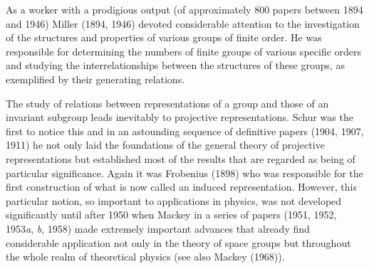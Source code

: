 \documentclass[11pt,a4paper,twoside,openright]{book}
\begin{document}
As a worker with a prodigious output (of approximately 800 papers between 1894 and 1946) Miller (1894, 1946) devoted considerable attention to the investigation of the structures and properties of various groups of finite order. He was responsible for determining the numbers of finite groups of various specific orders and studying the interrelationships between the structures of these groups, as exemplified by their generating relations.

The study of relations between representations of a group and those of an invariant subgroup leads inevitably to projective representations. Schur was the first to notice this and in an astounding sequence of definitive papers (1904, 1907, 1911) he not only laid the foundations of the general theory of projective representations but established most of the results that are regarded as being of particular significance. Again it was Frobenius (1898) who was responsible for the first construction of what is now called an induced representation. However, this particular notion, so important to applications in physics, was not developed significantly until after 1950 when Mackey in a series of papers (1951, 1952, 1953\textit{a}, \textit{b}, 1958) made extremely important advances that already find considerable application not only in the theory of space groups but throughout the whole realm of theoretical physics (see also Mackey (1968)).
\end{document}
